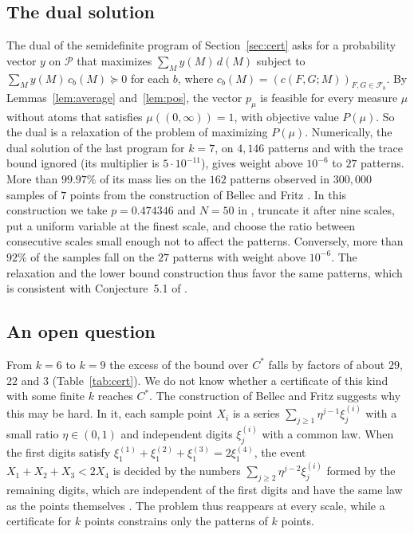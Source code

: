 \documentclass[11pt]{amsart}
\theoremstyle{definition}
\theoremstyle{remark}
\numberwithin{equation}{section}
\newcommand{\cP}{\mathcal{P}}
\newcommand{\cF}{\mathcal{F}}
\newcommand{\NDUAL}{27}
\newcommand{\DUALMASS}{99.97\%}
\newcommand{\NEXT}{162}
\begin{document}
\subsection*{The dual solution}
The dual of the semidefinite program of Section~\ref{sec:cert} asks for a probability vector $y$ on $\cP$ that maximizes $\sum_My(M)\,d(M)$ subject to $\sum_My(M)\,c_b(M)\succeq0$ for each $b$, where $c_b(M)=(c(F,G;M))_{F,G\in\cF_b}$. By Lemmas~\ref{lem:average} and~\ref{lem:pos}, the vector $p_\mu$ is feasible for every measure $\mu$ without atoms that satisfies $\mu((0,\infty))=1$, with objective value $P(\mu)$. So the dual is a relaxation of the problem of maximizing $P(\mu)$. Numerically, the dual solution of the last program for $k=7$, on $4{,}146$ patterns and with the trace bound ignored (its multiplier is $5\cdot10^{-11}$), gives weight above $10^{-6}$ to $\NDUAL$ patterns. More than $\DUALMASS$ of its mass lies on the $\NEXT$ patterns observed in $300{,}000$ samples of $7$ points from the construction of Bellec and Fritz \cite[Propositions~3.3 and~4.1]{BF26}. In this construction we take $p=0.474346$ and $N=50$ in \cite[(4.4)]{BF26}, truncate it after nine scales, put a uniform variable at the finest scale, and choose the ratio between consecutive scales small enough not to affect the patterns. Conversely, more than $92\%$ of the samples fall on the $\NDUAL$ patterns with weight above $10^{-6}$. The relaxation and the lower bound construction thus favor the same patterns, which is consistent with Conjecture~5.1 of \cite{BF26}.


\subsection*{An open question}\label{sec:open}
From $k=6$ to $k=9$ the excess of the bound over $C^*$ falls by factors of about $29$, $22$ and $3$ (Table~\ref{tab:cert}). We do not know whether a certificate of this kind with some finite $k$ reaches $C^*$. The construction of Bellec and Fritz suggests why this may be hard. In it, each sample point $X_i$ is a series $\sum_{j\ge1}\eta^{j-1}\xi^{(i)}_j$ with a small ratio $\eta\in(0,1)$ and independent digits $\xi^{(i)}_j$ with a common law. When the first digits satisfy $\xi^{(1)}_1+\xi^{(2)}_1+\xi^{(3)}_1=2\xi^{(4)}_1$, the event $X_1+X_2+X_3<2X_4$ is decided by the numbers $\sum_{j\ge2}\eta^{j-2}\xi^{(i)}_j$ formed by the remaining digits, which are independent of the first digits and have the same law as the points themselves \cite[proof of Proposition~3.3]{BF26}. The problem thus reappears at every scale, while a certificate for $k$ points constrains only the patterns of $k$ points.
\end{document}
